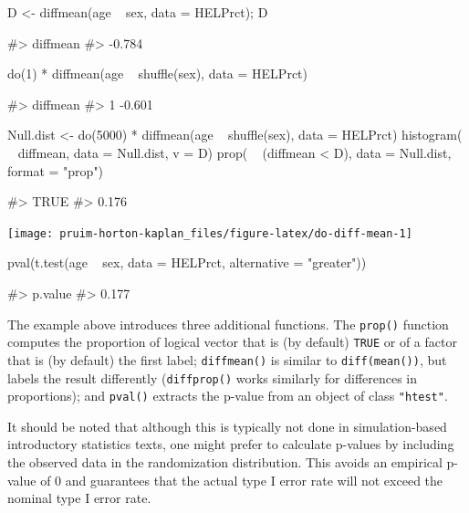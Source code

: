 \begin{Schunk}
\begin{Sinput}
D <- diffmean(age ~ sex, data = HELPrct); D 
\end{Sinput}
\begin{Soutput}
#> diffmean 
#>   -0.784
\end{Soutput}
\begin{Sinput}
do(1) * diffmean(age ~ shuffle(sex), data = HELPrct)
\end{Sinput}
\begin{Soutput}
#>   diffmean
#> 1   -0.601
\end{Soutput}
\begin{Sinput}
Null.dist <- do(5000) * diffmean(age ~ shuffle(sex), data = HELPrct)
histogram( ~ diffmean, data = Null.dist, v = D)
prop( ~ (diffmean < D), data = Null.dist, format = "prop")
\end{Sinput}
\begin{Soutput}
#>  TRUE 
#> 0.176
\end{Soutput}


\begin{center}\texttt{[image: pruim-horton-kaplan\_files/figure-latex/do-diff-mean-1]} \end{center}

\end{Schunk}

\begin{Schunk}
\begin{Sinput}
pval(t.test(age ~ sex, data = HELPrct, alternative = "greater"))
\end{Sinput}
\begin{Soutput}
#> p.value 
#>   0.177
\end{Soutput}
\end{Schunk}

The example above introduces three additional  functions.
The \texttt{prop()} function computes the proportion of logical vector
that is (by default) \texttt{TRUE} or of a factor that is (by default)
the first label; \texttt{diffmean()} is similar to
\texttt{diff(mean())}, but labels the result differently
(\texttt{diffprop()} works similarly for differences in proportions);
and \texttt{pval()} extracts the p-value from an object of class
\texttt{"htest"}.

It should be noted that although this is typically not done in
simulation-based introductory statistics texts, one might prefer to
calculate p-values by including the observed data in the randomization
distribution. This avoids an empirical p-value of 0 and guarantees that
the actual type I error rate will not exceed the nominal type I error
rate.

